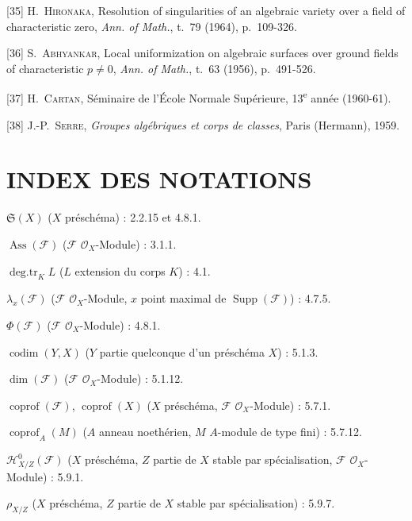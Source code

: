 [35] H.~\textsc{Hironaka}, Resolution of singularities of an
algebraic variety over a field of characteristic zero, \emph{Ann. of Math.},
t.~79 (1964), p.~109-326.

[36] S.~\textsc{Abhyankar}, Local uniformization on algebraic
surfaces over ground fields of characteristic $p\ne0$, \emph{Ann. of
Math.}, t.~63 (1956), p.~491-526.

[37] H.~\textsc{Cartan}, Séminaire de l'École Normale
Supérieure, 13\textsuperscript{e} année (1960-61).

[38] J.-P.~\textsc{Serre}, \emph{Groupes algébriques et corps de
classes}, Paris (Hermann), 1959.

\endgroup

\clearpage
{}
{}
\section*{INDEX DES NOTATIONS}

\begingroup
\small
\setlength{\parindent}{0pt}
\setlength{\parskip}{2pt}

$\mathfrak S(X)$ ($X$ préschéma) : 2.2.15 et 4.8.1.

$\operatorname{Ass}(\mathscr F)$ ($\mathscr F$ $\mathcal O_X$-Module) : 3.1.1.

$\operatorname{deg.tr}_K L$ ($L$ extension du corps $K$) : 4.1.

$\lambda_x(\mathscr F)$ ($\mathscr F$ $\mathcal O_X$-Module, $x$ point maximal
de $\operatorname{Supp}(\mathscr F)$) : 4.7.5.

$\Phi(\mathscr F)$ ($\mathscr F$ $\mathcal O_X$-Module) : 4.8.1.

$\operatorname{codim}(Y,X)$ ($Y$ partie quelconque d'un préschéma $X$) : 5.1.3.

$\dim(\mathscr F)$ ($\mathscr F$ $\mathcal O_X$-Module) : 5.1.12.

$\operatorname{coprof}(\mathscr F)$, $\operatorname{coprof}(X)$ ($X$
préschéma, $\mathscr F$ $\mathcal O_X$-Module) : 5.7.1.

$\operatorname{coprof}_A(M)$ ($A$ anneau noethérien, $M$ $A$-module de type
fini) : 5.7.12.

$\mathcal H^0_{X/Z}(\mathscr F)$ ($X$ préschéma, $Z$ partie de $X$ stable par
spécialisation, $\mathscr F$ $\mathcal O_X$-Module) : 5.9.1.

$\rho_{X/Z}$ ($X$ préschéma, $Z$ partie de $X$ stable par
spécialisation) : 5.9.7.

